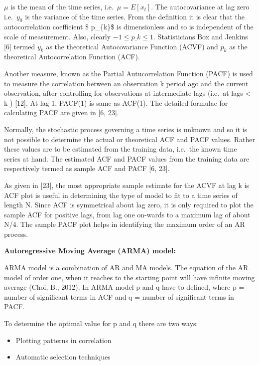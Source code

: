 \documentclass[12pt,a4paper]{book}
\begin{document}
{\(\mu\) is the mean of the time series,
i.e.~\(\mu = E\left[x_{t}\right]\). The autocovariance at lag zero
i.e.~\(y_{0}\) is the variance of the time series. From the definition
it is clear that the autocorrelation coefficient \$ p\_\{k\}\$ is
dimensionless and so is independent of the scale of measurement. Also,
clearly \(-1 \leq p\_{k}\leq 1\). Statisticians Box and Jenkins {[}6{]}
termed \(y_{k }\) as the theoretical Autocovariance Function (ACVF) and
\(p_{k}\) as the theoretical Autocorrelation Function (ACF).

Another measure, known as the Partial Autucorrelation Function (PACF) is
used to measure the correlation between an observation k period ago and
the current observation, after controlling for observations at
intermediate lags (i.e.~at lags \textless{} k ) {[}12{]}. At lag 1,
PACF(1) is same as ACF(1). The detailed formulae for calculating PACF
are given in {[}6, 23{]}.

Normally, the stochastic process governing a time series is unknown and
so it is not possible to determine the actual or theoretical ACF and
PACF values. Rather these values are to be estimated from the training
data, i.e.~the known time series at hand. The estimated ACF and PACF
values from the training data are respectively termed as sample ACF and
PACF {[}6, 23{]}.

As given in {[}23{]}, the most appropriate sample estimate for the ACVF
at lag k is ACF plot is useful in determining the type of model to fit
to a time series of length N. Since ACF is symmetrical about lag zero,
it is only required to plot the sample ACF for positive lags, from lag
one on-wards to a maximum lag of about N/4. The sample PACF plot helps
in identifying the maximum order of an AR process.

\textbf{Autoregressive Moving Average (ARMA) model:}

ARMA model is a combination of AR and MA models. The equation of the AR
model of order one, when it reaches to the starting point will have
infinite moving average (Choi, B., 2012). In ARMA model p and q have to
defined, where p = number of significant terms in ACF and q = number of
significant terms in PACF.

To determine the optimal value for p and q there are two ways:

\begin{itemize}
\item
  Plotting patterns in correlation
\item
  Automatic selection techniques
\end{itemize}

}
\end{document}
